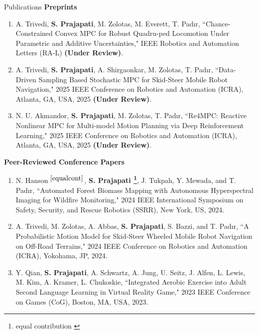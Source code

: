 \documentclass{resume}
\begin{document}
\begin{rSection}{Publications}
\textbf{Preprints}
\vspace{-1mm}
\begin{enumerate}[leftmargin=0.5cm]
\item A. Trivedi, \textbf{S. Prajapati}, M. Zolotas, M. Everett, T. Pad{\i}r, ``Chance-Constrained Convex MPC for Robust Quadru-ped Locomotion Under Parametric and Additive Uncertainties," IEEE Robotics and Automation Letters (RA-L) \textbf{(Under Review)}.
     \item A. Trivedi, \textbf{S. Prajapati}, A. Shirgaonkar, M. Zolotas, T. Pad{\i}r, ``Data-Driven Sampling Based Stochastic MPC for Skid-Steer Mobile
Robot Navigation," 2025 IEEE Conference on Robotics and Automation (ICRA), Atlanta, GA, USA, 2025 \textbf{(Under Review)}.
    \item N. U. Akmandor, \textbf{S. Prajapati}, M. Zolotas, T. Pad{\i}r, ``Re4MPC: Reactive Nonlinear MPC for Multi-model Motion Planning via Deep Reinforcement Learning," 2025 IEEE Conference on Robotics and Automation (ICRA), Atlanta, GA, USA, 2025 \textbf{(Under Review)}.
\end{enumerate}
\vspace{-1mm}
\textbf{Peer-Reviewed Conference Papers}
\vspace{-1mm}
\begin{enumerate}[leftmargin=0.5cm]
    \item N. Hanson$^{~\ref{equalcont}}$, \textbf{S. Prajapati \footnote{equal contribution \label{equalcont}}}, J. Tukpah, Y. Mewada, and T. Pad{\i}r, ``Automated Forest Biomass Mapping with Autonomous Hyperspectral
Imaging for Wildfire Monitoring," 2024 IEEE International Symposium on Safety, Security, and Rescue Robotics (SSRR), New York, US, 2024.
    \item A. Trivedi, M. Zolotas, A. Abbas, \textbf{S. Prajapati}, S. Bazzi, and T. Pad{\i}r, ``A Probabilistic Motion Model for Skid-Steer Wheeled Mobile Robot Navigation on Off-Road Terrains," 2024 IEEE Conference on Robotics and Automation (ICRA), Yokohama, JP, 2024.
    
    \item \vspace{-0.3em} Y. Qian, \textbf{S. Prajapati}, A. Schwartz, A. Jung, U. Seitz, J. Alfen, L. Lewis, M. Kim, A. Kramer, L. Chukoskie, ``Integrated Aerobic Exercise into Adult Second Language Learning in Virtual Reality Game," 2023 IEEE Conference on Games (CoG), Boston, MA, USA, 2023.


\end{enumerate}
\end{rSection}
\end{document}
